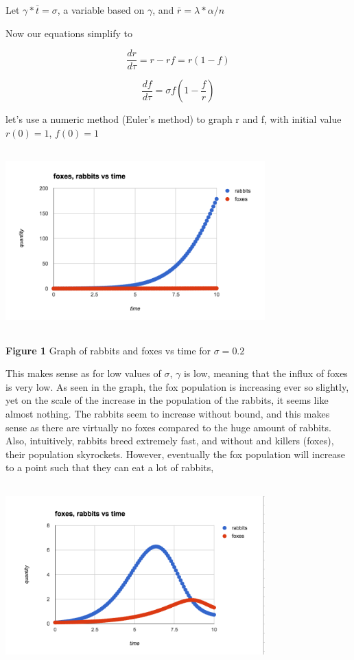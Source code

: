 \documentclass{article}
\begin{document}
Let $\gamma*\bar{t} = \sigma$, a variable based on $\gamma$, and  $\bar{r} = \lambda*\alpha/n$

Now our equations simplify to 

$$ \frac{dr}{d\tau} = r - rf = r(1 - f)$$

$$\frac{df}{d\tau}  = \sigma f(1 - \frac{f}{r})$$

let's use a numeric method (Euler's method) to graph r and f, with initial value $r(0) = 1$, $f(0) = 1$


\includegraphics[width=10cm, height=7cm]{2RabFox}

\textbf{Figure 1} Graph of rabbits and foxes vs time for $\sigma = 0.2$ 
\vspace{1cm}

This makes sense as for low values of $\sigma$, $\gamma$ is low, meaning that the influx of foxes is very low. As seen in the graph, the fox population is increasing ever so slightly, yet on the scale of the increase in the population of the rabbits, it seems like almost nothing. The rabbits seem to increase without bound, and this makes sense as there are virtually no foxes compared to the huge amount of rabbits. Also, intuitively, rabbits breed extremely fast, and without and killers (foxes), their population skyrockets. However, eventually the fox population will increase to a point such that they can eat a lot of rabbits, 

\includegraphics[width=10cm, height=7cm]{5RabFox}
\end{document}
